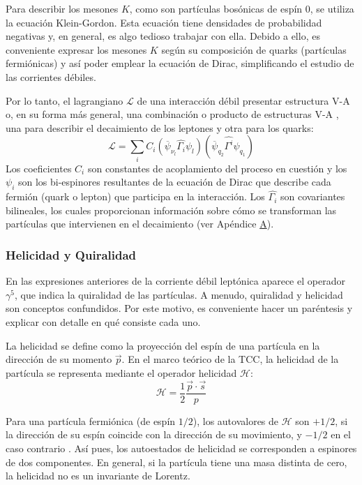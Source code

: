 Para describir los mesones $K$, como son partículas bosónicas de espín 0, se utiliza la ecuación Klein-Gordon. Esta ecuación tiene densidades de probabilidad negativas y, en general, es algo tedioso trabajar con ella. Debido a ello, es conveniente expresar los mesones $K$ según su composición de quarks (partículas fermiónicas) y así poder emplear la ecuación de Dirac, simplificando el estudio de las corrientes débiles.

Por lo tanto, el lagrangiano $\mathcal{L}$ de una interacción débil presentar estructura V-A o, en su forma más general, una combinación o producto de estructuras V-A \cite{Renton}, una para describir el decaimiento de los leptones y otra para los quarks:
\begin{equation}
\mathcal{L}= \sum _{i} C_{i}\left( \overline{\psi}_{\nu_l}\widehat{\Gamma_{i}}\psi _{l}\right)\left( \overline{\psi }_{q_2}\widehat{\Gamma^{i}}\psi _{q_1}\right)
\end{equation}
Los coeficientes $C_i$ son constantes de acoplamiento del proceso en cuestión y los $\psi_i$ son los bi-espinores resultantes de la ecuación de Dirac que describe cada fermión (quark o lepton) que participa en la interacción. Los $\widehat{\Gamma_{i}}$ son covariantes bilineales, los cuales proporcionan información sobre cómo se transforman las partículas que intervienen en el decaimiento (ver Apéndice \hyperref[cap:A]{A}).

\subsubsection{Helicidad y Quiralidad}\label{sec:quirality}

En las expresiones anteriores de la corriente débil leptónica aparece el operador $\gamma^5$, que indica la quiralidad de las partículas. A menudo, quiralidad y helicidad son conceptos confundidos. Por este motivo, es conveniente hacer un paréntesis y explicar con detalle en qué consiste cada uno.

La helicidad se define como la proyección del espín de una partícula en la dirección de su momento $\vec{p}$. En el marco teórico de la TCC, la helicidad de la partícula se representa mediante el operador helicidad $\mathcal{H}$:
\begin{equation}
\mathcal{H}=\dfrac{1}{2} \dfrac{\vec{p} \cdot \vec{s}}{p}
\end{equation} 

Para una partícula fermiónica (de espín $1/2$), los autovalores de $\mathcal{H}$ son $+1/2$, si la dirección de su espín coincide con la dirección de su movimiento, y $-1/2$ en el caso contrario \cite{Bettini}. Así pues, los autoestados de helicidad se corresponden a espinores de dos componentes. En general, si la partícula tiene una masa distinta de cero, la helicidad no es un invariante de Lorentz.


